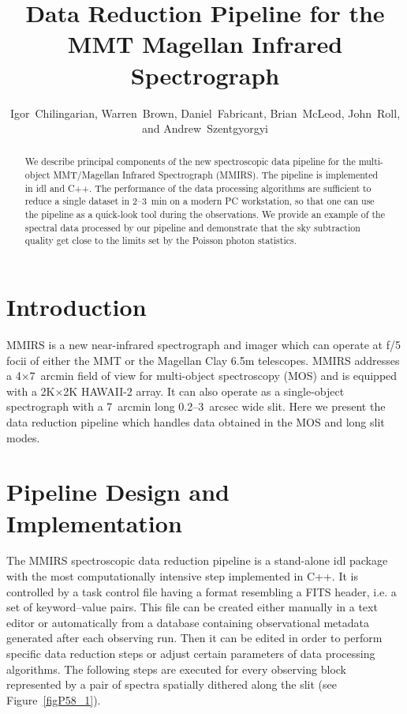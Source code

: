 
\resetcounters




\title{Data Reduction Pipeline for the MMT Magellan Infrared Spectrograph
}
\author{Igor~Chilingarian, 
Warren~Brown, Daniel~Fabricant, 
Brian~McLeod, John~Roll,
and Andrew~Szentgyorgyi
}


\begin{abstract} We describe principal components of the new spectroscopic data pipeline for the multi-object MMT/Magellan Infrared Spectrograph (MMIRS).  The pipeline is implemented in {\sc idl} and {\sc C++}.  The performance of the data processing algorithms are sufficient to reduce a single dataset in 2--3~min on a modern PC workstation, so that one can use the pipeline as a quick-look tool during the observations.  We provide an example of the spectral data processed by our pipeline and demonstrate that the sky subtraction quality get close to the limits set by the Poisson photon statistics.
\end{abstract}

\section{Introduction} 

MMIRS \citep{McLeod+12} is a new near-infrared spectrograph and imager which can operate at f/5 focii of either the MMT or the Magellan Clay 6.5m telescopes.  MMIRS addresses a 4$\times$7~arcmin field of view for multi-object spectroscopy (MOS) and is equipped with a 2K$\times$2K HAWAII-2 array.  It can also operate as a single-object spectrograph with a 7~arcmin long 0.2--3~arcsec wide slit.  Here we present the data reduction pipeline which handles data obtained in the MOS and long slit modes.

\section{Pipeline Design and Implementation}

The MMIRS spectroscopic data reduction pipeline is a stand-alone {\sc idl} package with the most computationally intensive step implemented in {\sc C++}.  It is controlled by a task control file having a format resembling a FITS header, i.e.  a set of keyword--value pairs.  This file can be created either manually in a text editor or automatically from a database containing observational metadata generated after each observing run.  Then it can be edited in order to perform specific data reduction steps or adjust certain parameters of data processing algorithms.  The following steps are executed for every observing block represented by a pair of spectra spatially dithered along the slit (see Figure~\ref{figP58_1}).


